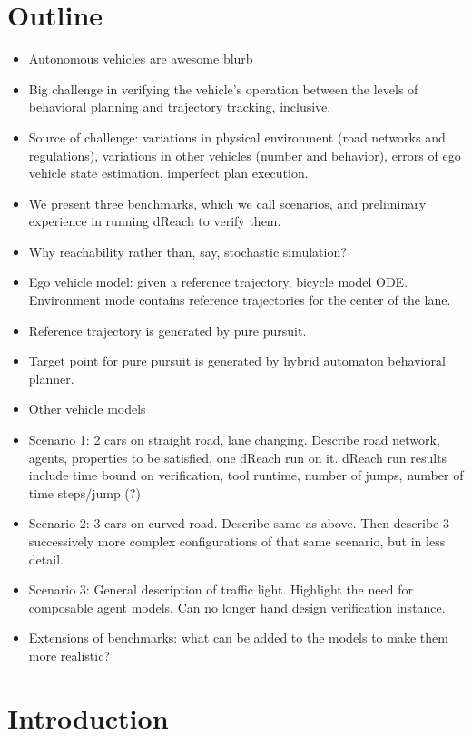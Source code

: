 \documentclass{easychair}
\theoremstyle{theorem}
\theoremstyle{remark}
\begin{document}
\section{Outline}
\begin{itemize}
\item Autonomous vehicles are awesome blurb

\item Big challenge in verifying the vehicle's operation between the levels of behavioral planning and trajectory tracking, inclusive. 
\item Source of challenge: variations in physical environment (road networks and regulations), variations in other vehicles (number and behavior), errors of ego vehicle state estimation, imperfect plan execution.
\item We present three benchmarks, which we call scenarios, and preliminary experience in running dReach to verify them.
\item Why reachability rather than, say, stochastic simulation?
\item Ego vehicle model: given a reference trajectory, bicycle model ODE. Environment mode contains reference trajectories for the center of the lane. 
\item Reference trajectory is generated by pure pursuit. 
\item Target point for pure pursuit is generated by hybrid automaton behavioral planner.
\item Other vehicle models
\item Scenario 1: 2 cars on straight road, lane changing.
Describe road network, agents, properties to be satisfied, one dReach run on it.
dReach run results include time bound on verification, tool runtime, number of jumps, number of time steps/jump (?)
\item Scenario 2: 3 cars on curved road. 
Describe same as above.
Then describe 3 successively more complex configurations of that same scenario, but in less detail.
\item Scenario 3: General description of traffic light. Highlight the need for composable agent models. Can no longer hand design verification instance. 
\item Extensions of benchmarks: what can be added to the models to make them more realistic?
\end{itemize}

\section{Introduction}
\label{sect:introduction}
\end{document}
